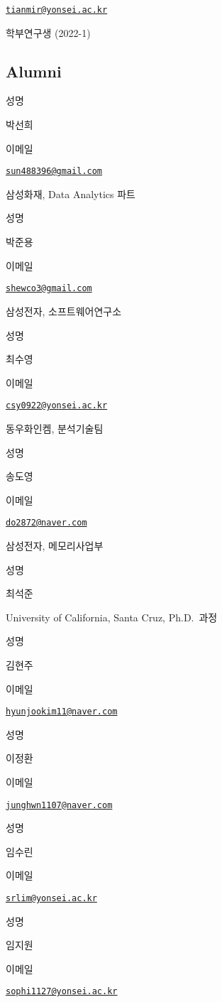 \documentclass[
]{book}
\begin{document}
\href{mailto:tianmir@yonsei.ac.kr}{\nolinkurl{tianmir@yonsei.ac.kr}}

학부연구생 (2022-1)

\hypertarget{alumni}{%
\subsection*{Alumni}\label{alumni}}

성명

박선희

이메일

\href{mailto:sun488396@gmail.com}{\nolinkurl{sun488396@gmail.com}}

삼성화재, Data Analytics 파트

성명

박준용

이메일

\href{mailto:shewco3@gmail.com}{\nolinkurl{shewco3@gmail.com}}

삼성전자, 소프트웨어연구소

성명

최수영

이메일

\href{mailto:csy0922@yonsei.ac.kr}{\nolinkurl{csy0922@yonsei.ac.kr}}

동우화인켐, 분석기술팀

성명

송도영

이메일

\href{mailto:do2872@naver.com}{\nolinkurl{do2872@naver.com}}

삼성전자, 메모리사업부

성명

최석준

University of California, Santa Cruz, Ph.D.~과정

성명

김현주

이메일

\href{mailto:hyunjookim11@naver.com}{\nolinkurl{hyunjookim11@naver.com}}

성명

이정환

이메일

\href{mailto:junghwn1107@naver.com}{\nolinkurl{junghwn1107@naver.com}}

성명

임수린

이메일

\href{mailto:srlim@yonsei.ac.kr}{\nolinkurl{srlim@yonsei.ac.kr}}

성명

임지원

이메일

\href{mailto:sophi1127@yonsei.ac.kr}{\nolinkurl{sophi1127@yonsei.ac.kr}}

  
\end{document}
